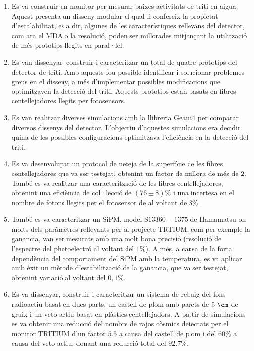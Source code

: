 \begin{enumerate}

\item{} Es va construir un monitor per mesurar baixes activitats de triti en aigua. Aquest presenta un disseny modular el qual li confereix la propietat d'escalabilitat, es a dir, algunes de les característiques rellevans del detector, com ara el MDA o la resolució, poden ser millorades mitjançant la utilització de més prototips llegits en paral·lel.

\item{} Es van dissenyar, construir i caracteritzar un total de quatre prototips del detector de triti. Amb aquests fou possible identificar i solucionar problemes greus en el disseny, a més d'implementar possibles modificacions que optimitzaven la detecció del triti. Aquests prototips estan basats en fibres centellejadores llegits per fotosensors.

\item{} Es van realitzar diverses simulacions amb la llibreria Geant4 per comparar diversos dissenys del detector. L'objectiu d'aquestes simulacions era decidir quina de les possibles configuracions optimitzava l'eficiència en la detecció del triti.

\item{} Es va desenvolupar un protocol de neteja de la superfície de les fibres centellejadores que va ser testejat, obtenint un factor de millora de més de $2$. També es va realitzar una caracterització de les fibres centellejadores, obtenint una eficiència de col·lecció de $(76 \pm 8)\%$ i una incertesa en el nombre de fotons llegits per el fotosensor de al voltant de $3\%$.

\item{} També es va caracteritzar un SiPM, model S$13360-1375$ de Hamamatsu on molts dels paràmetres rellevants per al projecte TRTIUM, com per exemple la ganancia, van ser mesurats amb una molt bona precisió (resolució de l'espectre del photoelectró al voltant del $1\%$). A més, a causa de la forta dependència del comportament del SiPM amb la temperatura, es va aplicar amb èxit un mètode d'estabilització de la ganancia, que va ser testejat, obtenint variació al voltant del $0,1\%$.

\item{} Es va dissenyar, construir i caracteritzar un sistema de rebuig del fons radioactiu basat en dues parts, un castell de plom amb parets de $5~\cm$ de gruix i un veto actiu basat en plàstics centellejadors. A partir de simulacions es va obtenir una reducció del nombre de rajos còsmics detectats per el monitor TRITIUM d'un factor $5.5$ a causa del castell de plom i del $60\%$ a causa del veto actiu, donant una reducció total del $92.7\%$.


\end{enumerate}
